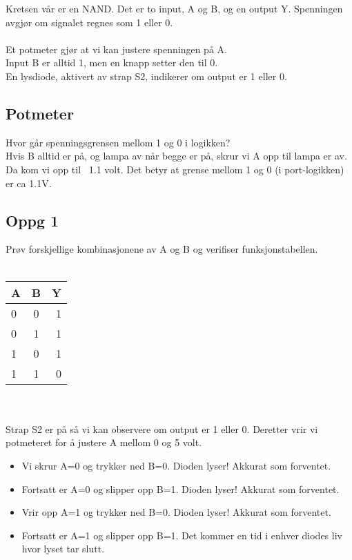 Kretsen vår er en NAND.
Det er to input, A og B, og en output Y.
Spenningen avgjør om signalet regnes som 1 eller 0.
\\\\
Et potmeter gjør at vi kan justere spenningen på A. \\
Input B er alltid 1, men en knapp setter den til 0. \\
En lysdiode, aktivert av strap S2, indikerer om output er 1 eller 0.

\subsection{Potmeter}
Hvor går spenningsgrensen mellom 1 og 0 i logikken?
\\
Hvis B alltid er på, og lampa av når begge er på, skrur vi A opp til lampa
er av.
Da kom vi opp til ~1.1 volt.
Det betyr at grense mellom 1 og 0 (i port-logikken) er ca 1.1V.

\subsection{Oppg 1}
Prøv forskjellige kombinasjonene av A og B og verifiser funksjonstabellen.
\\\\
\begin{tabular}{l|c|r}
  A & B & Y \\ \hline
  0 & 0 & 1 \\ \hline
  0 & 1 & 1 \\ \hline
  1 & 0 & 1 \\ \hline
  1 & 1 & 0 \\
\end{tabular}
\\\\
Strap S2 er på så vi kan observere om output er 1 eller 0.
Deretter vrir vi potmeteret for å justere A mellom 0 og 5 volt.
\begin{itemize}
\item Vi skrur A=0 og trykker ned B=0.
      Dioden lyser! Akkurat som forventet.
\item Fortsatt er A=0 og slipper opp B=1.
      Dioden lyser! Akkurat som forventet.
\item Vrir opp A=1 og trykker ned B=0.
      Dioden lyser! Akkurat som forventet.
\item Fortsatt er A=1 og slipper opp B=1.
      Det kommer en tid i enhver diodes liv hvor lyset tar slutt.
\end{itemize}

